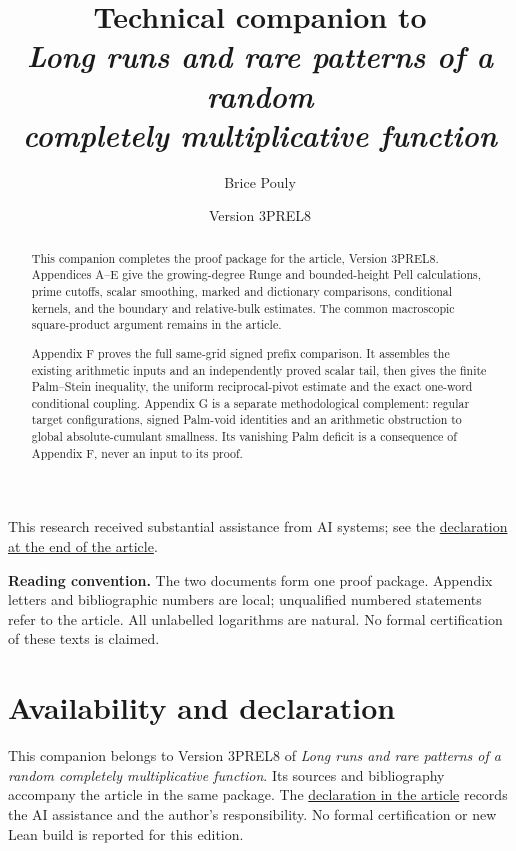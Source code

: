 \documentclass[11pt,a4paper]{article}
\title{\textbf{Technical companion to}\\[2mm]
\large\emph{Long runs and rare patterns of a random\\completely multiplicative function}}
\author{Brice Pouly}
\date{Version 3PREL8}
\begin{document}
\maketitle
\vspace{-0.6em}
\noindent\begin{minipage}{\textwidth}\footnotesize
This research received substantial assistance from AI systems; see the
\hyperref[sec:ai-assistance]{declaration at the end of the article}.
\end{minipage}\medskip
\begin{abstract}
This companion completes the proof package for the article, Version 3PREL8.
Appendices A--E give the growing-degree Runge and bounded-height Pell
calculations, prime cutoffs, scalar smoothing, marked and dictionary
comparisons, conditional kernels, and the boundary and relative-bulk
estimates. The common macroscopic square-product argument remains in
the article.

Appendix F proves the full same-grid signed prefix comparison. It
assembles the existing arithmetic inputs and an independently proved
scalar tail, then gives the finite Palm--Stein inequality, the uniform
reciprocal-pivot estimate and the exact one-word conditional coupling.
Appendix G is a separate methodological complement: regular target
configurations, signed Palm-void identities and an arithmetic obstruction
to global absolute-cumulant smallness. Its vanishing Palm deficit is a
consequence of Appendix F, never an input to its proof.
\end{abstract}
\medskip
\noindent\textbf{Reading convention.} The two documents form one proof package.
Appendix letters and bibliographic numbers are local; unqualified
numbered statements refer to the article. All unlabelled logarithms are
natural. No formal certification of these texts is claimed.

\tableofcontents
\clearpage


\medskip
\appendix







\section*{Availability and declaration}
This companion belongs to Version 3PREL8 of \emph{Long runs and rare
patterns of a random completely multiplicative function}. Its sources
and bibliography accompany the article in the same package. The
\hyperref[sec:ai-assistance]{declaration in the article} records the AI
assistance and the author's responsibility. No formal certification or
new Lean build is reported for this edition.
\printbibliography[heading=bibintoc,title={References}]
\end{document}
